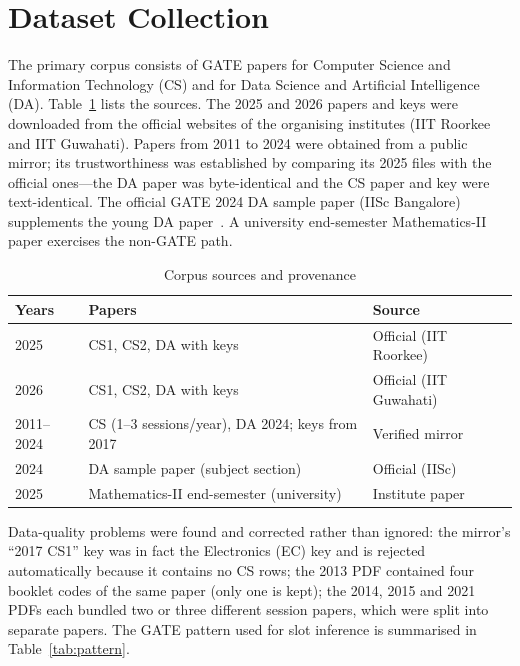 \section{Dataset Collection}
The primary corpus consists of GATE papers for Computer Science and Information Technology (CS) and for Data Science and
Artificial Intelligence (DA). Table~\ref{tab:sources} lists the sources. The 2025 and 2026 papers and keys were
downloaded from the official websites of the organising institutes (IIT Roorkee and IIT Guwahati). Papers from 2011 to
2024 were obtained from a public mirror; its trustworthiness was established by comparing its 2025 files with the
official ones---the DA paper was byte-identical and the CS paper and key were text-identical. The official GATE 2024 DA
sample paper (IISc Bangalore) supplements the young DA paper~\cite{gate2025,gate2026}. A university end-semester Mathematics-II paper exercises
the non-GATE path.

\begin{table}[h]
\centering
\caption{Corpus sources and provenance}
\label{tab:sources}
\small
\begin{tabularx}{\textwidth}{@{}lXl@{}}
\toprule
\textbf{Years} & \textbf{Papers} & \textbf{Source}\\
\midrule
2025 & CS1, CS2, DA with keys & Official (IIT Roorkee)\\
2026 & CS1, CS2, DA with keys & Official (IIT Guwahati)\\
2011--2024 & CS (1--3 sessions/year), DA 2024; keys from 2017 & Verified mirror\\
2024 & DA sample paper (subject section) & Official (IISc)\\
2025 & Mathematics-II end-semester (university) & Institute paper\\
\bottomrule
\end{tabularx}
\end{table}

Data-quality problems were found and corrected rather than ignored: the mirror's ``2017 CS1'' key was in fact the
Electronics (EC) key and is rejected automatically because it contains no CS rows; the 2013 PDF contained four booklet
codes of the same paper (only one is kept); the 2014, 2015 and 2021 PDFs each bundled two or three different session
papers, which were split into separate papers. The GATE pattern used for slot inference is summarised in
Table~\ref{tab:pattern}.

